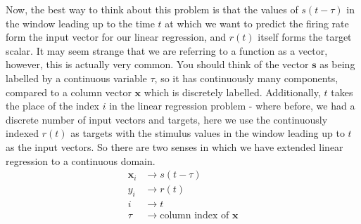 \documentclass{article}
\begin{document}
\begin{figure}[H]
	\centering

\end{figure}

Now, the best way to think about this problem is that the values of $s(t-\tau)$ in the window leading up to the time $t$ at which we want to predict the firing rate form the input vector for our linear regression, and $r(t)$ itself forms the target scalar. It may seem strange that we are referring to a function as a vector, however, this is actually very common. You should think of the vector $\bm{s}$ as being labelled by a continuous variable $\tau$, so it has continuously many components, compared to a column vector $\bm{x}$ which is discretely labelled. Additionally, $t$ takes the place of the index $i$ in the linear regression problem - where before, we had a discrete number of input vectors and targets, here we use the continuously indexed $r(t)$ as targets with the stimulus values in the window leading up to $t$ as the input vectors. So there are two senses in which we have extended linear regression to a continuous domain.\\

\begin{align*}
	\bm{x}_i & \rightarrow s(t-\tau)                      \\
	y_i      & \rightarrow r(t)                           \\
	i        & \rightarrow t                              \\
	\tau     & \rightarrow \text{column index of } \bm{x} \\
\end{align*}
\end{document}
